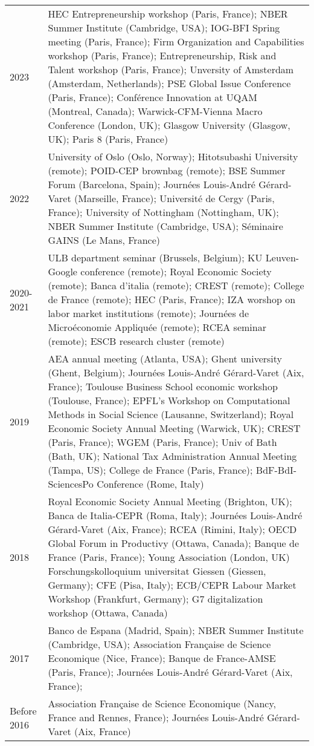 \documentclass[12pt]{article}
\begin{document}
\begin{footnotesize}
\begin{tabular}{p{1cm}p{13cm}}
2023 & HEC Entrepreneurship workshop (Paris, France); NBER Summer Institute (Cambridge, USA); IOG-BFI Spring meeting (Paris, France); Firm Organization and Capabilities workshop (Paris, France); Entrepreneurship, Risk and Talent workshop (Paris, France); Unversity of Amsterdam (Amsterdam, Netherlands); PSE Global Issue Conference (Paris, France); Conférence Innovation at UQAM (Montreal, Canada); Warwick-CFM-Vienna Macro Conference (London, UK); Glasgow University (Glasgow, UK); Paris 8 (Paris, France) \\
2022 & University of Oslo (Oslo, Norway); Hitotsubashi University (remote); POID-CEP brownbag (remote); BSE Summer Forum (Barcelona, Spain); Journées Louis-André Gérard-Varet (Marseille, France); Université de Cergy (Paris, France); University of Nottingham (Nottingham, UK); NBER Summer Institute (Cambridge, USA); Séminaire GAINS (Le Mans, France) \\ 
 2020-2021 &  ULB department seminar (Brussels, Belgium); KU Leuven-Google conference (remote);  Royal Economic Society (remote); Banca d'italia (remote); CREST (remote); College de France (remote); HEC (Paris, France); IZA worshop on labor market institutions (remote); Journées de Microéconomie Appliquée (remote); RCEA seminar (remote); ESCB research cluster (remote) \\
 2019 & AEA annual meeting (Atlanta, USA); Ghent university (Ghent, Belgium); Journées Louis-André Gérard-Varet (Aix, France); Toulouse Business School economic workshop (Toulouse, France); EPFL's Workshop on Computational Methods in Social Science (Lausanne, Switzerland); Royal Economic Society Annual Meeting (Warwick, UK); CREST (Paris, France); WGEM (Paris, France); Univ of Bath (Bath, UK); National Tax Administration Annual Meeting (Tampa, US); College de France (Paris, France); BdF-BdI-SciencesPo Conference (Rome, Italy) \\ 
 2018 &  Royal Economic Society Annual Meeting (Brighton, UK); Banca de Italia-CEPR (Roma, Italy); Journées Louis-André Gérard-Varet (Aix, France); RCEA (Rimini, Italy); OECD Global Forum in Productivy (Ottawa, Canada); Banque de France (Paris, France); Young Association (London, UK)  Forschungskolloquium universitat Giessen (Giessen, Germany);  CFE (Pisa, Italy); ECB/CEPR Labour Market Workshop (Frankfurt, Germany); G7 digitalization workshop (Ottawa, Canada)\\
 2017 & Banco de Espana (Madrid, Spain); NBER Summer Institute (Cambridge, USA); Association Française de Science Economique (Nice, France); Banque de France-AMSE (Paris, France); Journées Louis-André Gérard-Varet (Aix, France);\\
 Before 2016 & Association Française de Science Economique (Nancy, France and Rennes, France); Journées Louis-André Gérard-Varet (Aix, France) 
 \end{tabular}
\end{footnotesize}
\end{document}

